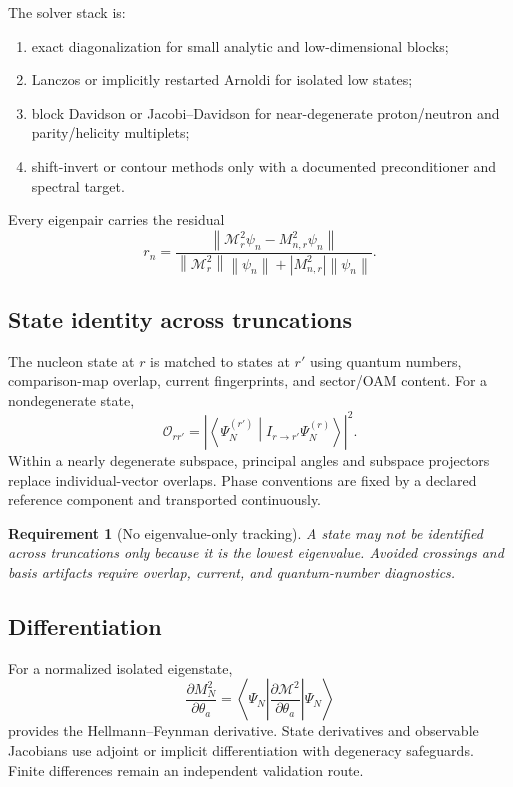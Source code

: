 \documentclass[11pt]{article}
\newtheorem{requirement}[definition]{Requirement}
\newcommand{\cO}{\mathcal O}
\newcommand{\cM}{\mathcal M}
\newcommand{\abs}[1]{\left|#1\right|}
\newcommand{\norm}[1]{\left\lVert#1\right\rVert}
\newcommand{\inner}[2]{\left\langle #1\middle|#2\right\rangle}
\begin{document}
The solver stack is:
\begin{enumerate}
 \item exact diagonalization for small analytic and low-dimensional blocks;
 \item Lanczos or implicitly restarted Arnoldi for isolated low states;
 \item block Davidson or Jacobi--Davidson for near-degenerate proton/neutron
 and parity/helicity multiplets;
 \item shift-invert or contour methods only with a documented preconditioner
 and spectral target.
\end{enumerate}
Every eigenpair carries the residual
\begin{equation}
 r_n=\frac{\norm{\cM_r^2\psi_n-M_{n,r}^2\psi_n}}
 {\norm{\cM_r^2}\norm{\psi_n}+|M_{n,r}^2|\norm{\psi_n}}.
 \label{eq:eigen-residual}
\end{equation}

\subsection{State identity across truncations}

The nucleon state at \(r\) is matched to states at \(r'\) using quantum
numbers, comparison-map overlap, current fingerprints, and sector/OAM content.
For a nondegenerate state,
\begin{equation}
 \cO_{rr'}
 =\abs{\inner{\Psi_N^{(r')}}{I_{r\to r'}\Psi_N^{(r)}}}^2.
 \label{eq:state-overlap}
\end{equation}
Within a nearly degenerate subspace, principal angles and subspace projectors
replace individual-vector overlaps.  Phase conventions are fixed by a declared
reference component and transported continuously.

\begin{requirement}[No eigenvalue-only tracking]
A state may not be identified across truncations only because it is the lowest
eigenvalue.  Avoided crossings and basis artifacts require overlap, current,
and quantum-number diagnostics.
\label{req:no-eigenvalue-tracking}
\end{requirement}

\subsection{Differentiation}

For a normalized isolated eigenstate,
\begin{equation}
 \frac{\partial M_N^2}{\partial\theta_a}
 =\left\langle\Psi_N\left|
 \frac{\partial\cM^2}{\partial\theta_a}
 \right|\Psi_N\right\rangle
 \label{eq:hellmann-feynman}
\end{equation}
provides the Hellmann--Feynman derivative.  State derivatives and observable
Jacobians use adjoint or implicit differentiation with degeneracy safeguards.
Finite differences remain an independent validation route.
\end{document}
